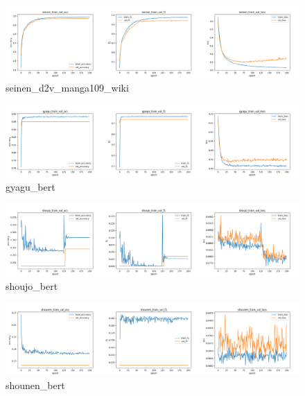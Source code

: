 \documentclass[twocolumn]{jarticle}     %
\begin{document}
\begin{figure}[h]
  \begin{center} %
    \includegraphics[width=14.0cm]{seinen_manga109_wiki.png}
    \caption{seinen\_d2v\_manga109\_wiki} %
    \label{fig:seinen_d2v_manga109_wiki} %
  \end{center}
\end{figure}

\clearpage

\begin{figure}[h]
  \begin{center} %
    \includegraphics[width=14.0cm]{gyagu_bert.png}
    \caption{gyagu\_bert} %
    \label{fig:gyagu_bert} %
  \end{center}
\end{figure}

\begin{figure}[h]
  \begin{center} %
    \includegraphics[width=14.0cm]{shoujo_bert.png}
    \caption{shoujo\_bert} %
    \label{fig:shoujo_bert} %
  \end{center}
\end{figure}

\begin{figure}[h]
  \begin{center} %
    \includegraphics[width=14.0cm]{shounen_bert.png}
    \caption{shounen\_bert} %
    \label{fig:shounen_bert} %
  \end{center}
\end{figure}
\end{document}
